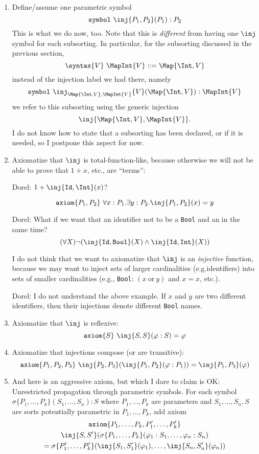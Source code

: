\documentclass{article}
\newcommand\comment[2]{\par\noindent\color{red}#1: #2\color{black}\par\noindent}
\newcommand\dl{\comment{Dorel}}
\theoremstyle{definition}
\theoremstyle{definition}
\theoremstyle{definition}
\theoremstyle{theorem}
\theoremstyle{theorem}
\theoremstyle{theorem}
\newcommand{\KWsymbol}{\texttt{symbol}}
\newcommand{\axiom}{\texttt{axiom}}
\begin{document}
\begin{enumerate}[label=(\arabic*)]
\item\label{assume-inj}
Define/assume one parametric symbol
\[\KWsymbol\ \inj\{P_1,P_2\}(P_1):P_2\]
This is what we do now, too.
Note that this is \emph{different} from having one \(\inj\)
symbol for each subsorting.
In particular, for the subsorting discussed in the previous section,
\[\syntax\{V\}\ \MapInt{V}::=\Map{\Int,V}\]
instead of the injection label we had there, namely
\[\KWsymbol\ \inj_{\Map{\Int,V},\MapInt{V}}\{V\}(\Map{\Int,V}):\MapInt{V}\]
we refer to this subsorting using the generic injection
\[\inj\{\Map{\Int,V},\MapInt{V}\}.\]
I do not know how to state that a subsorting has been declared,
or if it is needed, so I postpone this aspect for now.

\item\label{axiom-total-function-like}
Axiomatize that \(\inj\) is total-function-like, because otherwise we will not
be able to prove that \(1+x\), etc., are ``terms'':
\dl{{\(1 + \inj\{\texttt{Id}, \Int\}(x)\)}?}
\[\axiom\{P_1,P_2\}\ \forall x:P_1.\exists y:P_2.\inj\{P_1,P_2\}(x)=y\]
\dl{What if we want that an identifier not to be a \texttt{Bool} and an \Int{} in the same time?\\
\[(\forall X)\neg (\inj\{\texttt{Id},\texttt{Bool}\}(X)
  \land \inj\{\texttt{Id},\texttt{Int}\}(X))\]}
I do not think that we want to axiomatize that \(\inj\) is an
\emph{injective} function, because we may want to inject sets of larger
cardinalities (e.g.identifiers) into sets of smaller cardinalities
(e.g., \texttt{Bool}: \((x\ \text{or}\ y)\) and \(x=x\), etc.).
\dl{I do not understand the above example. If $x$ and $y$ are two different identifiers, then their injections denote different \texttt{Bool} names.}

\item\label{axiom-reflexive}
Axiomatize that \(\inj\) is reflexive:
\[\axiom\{S\}\ \inj\{S,S\}(\varphi:S) = \varphi\]

\item\label{axiom-transitive}
Axiomatize that injections compose (or are transitive):
\[\axiom\{P_1,P_2,P_3\}\ \inj\{P_2,P_3\}(\inj\{P_1,P_2\}(\varphi:P_1))
 = \inj\{P_1,P_3\}(\varphi)\]

\item\label{axiom-parametric-symbol}
And here is an aggressive axiom, but which I dare to claim is OK:
Unrestricted propagation through parametric symbols.
For each symbol \(\sigma\{P_1,\ldots,P_k\}(S_1,\ldots,S_n):S\)
where \(P_1,\ldots,P_k\) are parameters and
\(S_1,\ldots,S_n,S\) are sorts potentially parametric in
\(P_1,\ldots,P_k\), add axiom
\begin{multline*}
\axiom\{P_1,\ldots,P_k,P'_1,\ldots,P'_k\}\\
\inj\{S,S'\}(\sigma\{P_1,\ldots,P_k\}(\varphi_1:S_1,\ldots,\varphi_n:S_n)\\
= \sigma\{P'_1,\ldots,P'_k\}(\inj\{S_1,S'_1\}(\varphi_1),\ldots,\inj\{S_n,S'_n\}(\varphi_n))
\end{multline*}
\end{enumerate}
\end{document}
